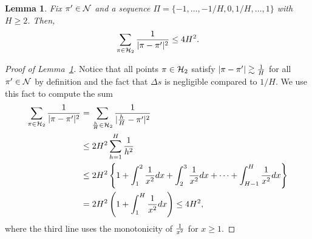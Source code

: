 \documentclass[twoside,11pt]{article}
\theoremstyle{plain}
\newtheorem{lem}{Lemma}
\theoremstyle{definition}
\begin{document}
\begin{lem}\label{lem:H}
Fix $\pi'\in\mathcal{N}$ and a sequence $\Pi=\{-1,\ldots,-1/H,0,1/H,\ldots,1\}$ with $H\geq 2$. Then, 
\[
\sum_{\pi \in \mathcal{H}_2}{1\over 
|\pi-\pi'|^2}\leq 4H^2. 
\]
\end{lem}
\begin{proof}[Proof of Lemma~\ref{lem:H}]
Notice that all points $\pi\in\mathcal{H}_2$ satisfy $|\pi-\pi'|\gtrsim{1\over H}$ for all $\pi'\in\mathcal{N}$ by definition and the fact that $\Delta s$ is negligible compared to $1/H$. We use this fact to compute the sum
\begin{align}
   \sum_{\pi \in \mathcal{H}_2}{1\over |\pi-\pi'|^2}&= \sum_{\frac{h}{H}\in\mathcal{H}_2 } {1\over |\frac{h}{H}-\pi'|^2}\\
   &\leq 2H^2\sum_{h=1}^{H}{1 \over h^2}\\
 &\leq 2H^2\left\{ 1+\int_{1}^2{1\over x^2}dx+ \int_{2}^3{1\over x^2}dx+\cdots + \int_{H-1}^H{1\over x^2}dx\right\}\\
&= 2H^2\left(1+\int^{H}_{1}{1\over x^2}dx\right) \leq 4H^2,
\end{align}
 where the third line uses the monotonicity of ${1\over x^2}$ for $x\geq 1$. 
 \end{proof}
\end{document}
